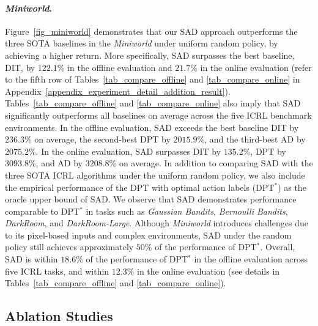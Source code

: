 \documentclass[10pt]{article}
\begin{document}
\paragraph{\textit{Miniworld}.}
Figure~\ref{fig_miniworld} demonstrates that our SAD approach outperforms the three SOTA baselines in the \textit{Miniworld} under uniform random policy, by achieving a higher return.
More specifically, SAD surpasses the best baseline, DIT, by $122.1\%$ in the offline evaluation and $21.7\%$ in the online evaluation (refer to the fifth row of Tables~\ref{tab_compare_offline} and \ref{tab_compare_online} in Appendix~\ref{appendix_experiment_detail_addition_result}).
Tables~\ref{tab_compare_offline} and \ref{tab_compare_online} also imply that SAD significantly outperforms all baselines on average across the five ICRL benchmark environments. In the offline evaluation, SAD exceeds the best baseline DIT by $236.3\%$ on average, the second-best DPT by $2015.9\%$, and the third-best AD by $2075.2\%$. In the online evaluation, SAD surpasses DIT by $135.2\%$, DPT by $3093.8\%$, and AD by $3208.8\%$ on average.
In addition to comparing SAD with the three SOTA ICRL algorithms under the uniform random policy, we also include the empirical performance of the DPT with optimal action labels (DPT$^*$) as the oracle upper bound of SAD. We observe that SAD demonstrates performance comparable to DPT$^*$ in tasks such as \textit{Gaussian Bandits}, \textit{Bernoulli Bandits}, \textit{DarkRoom}, and \textit{DarkRoom-Large}. Although \textit{Miniworld} introduces challenges due to its pixel-based inputs and complex environments, SAD under the random policy still achieves approximately $50\%$ of the performance of DPT$^*$. Overall, SAD is within $18.6\%$ of the performance of DPT$^*$ in the offline evaluation across five ICRL tasks, and within $12.3\%$ in the online evaluation (see details in Tables~\ref{tab_compare_offline} and \ref{tab_compare_online}).
\subsection{Ablation Studies}
\label{subsec_ablation}
\end{document}
